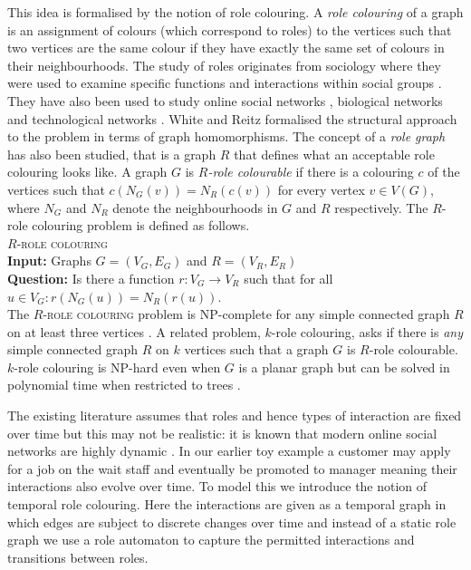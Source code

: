 \documentclass[runningheads]{llncs}
\begin{document}
This idea is formalised by the notion of role colouring.
A \textit{role colouring} of a graph is an assignment of colours (which correspond to roles) to the vertices such that two vertices are the same colour if they have exactly the same set of colours in their neighbourhoods. 
The study of roles originates  from sociology where they were used to examine specific functions and interactions within social groups \cite{borgatti2024analyzing,lorrain1971structural}. They have also been used to study online social networks \cite{golder2004social}, biological networks \cite{luczkovich2003defining} and technological networks \cite{scripps2007node}.
White and Reitz \cite{white1983graph} formalised the structural approach to the problem in terms of graph homomorphisms.
The concept of a \textit{role  graph} has also been studied, that is a graph $R$ that defines what an acceptable role colouring looks like. A graph $G$ is \textit{$R$-role colourable} if there is a colouring $c$ of the vertices such that $c(N_G(v))=N_R(c(v))$ for every vertex $v \in V(G)$, where $N_G$ and $N_R$ denote the neighbourhoods in $G$ and $R$ respectively. 
The $R$-role colouring problem is defined as follows.\\

\noindent
\textsc{$R$-role colouring}\\
\textbf{Input:} Graphs $G=(V_G,E_G)$ and $R=(V_R,E_R)$\\
\textbf{Question:} Is there a function $r:V_G \rightarrow V_R$ such that for all $u\in V_G: r(N_G(u))=N_R(r(u))$.\\

The \textsc{$R$-role colouring} problem is NP-complete for any simple connected graph $R$ on at least three vertices \cite{fiala2005complete}. A related problem, $k$-role colouring, asks if there is \emph{any} simple connected graph $R$ on $k$ vertices such that a graph $G$ is $R$-role colourable.   $k$-role colouring is NP-hard even when $G$ is a planar graph but can be solved in polynomial time when restricted to trees \cite{purcell2015complexity}.

The existing literature assumes that roles and hence types of interaction are fixed over time but this may not be realistic: it is known that modern online social networks are highly dynamic \cite{kumar2006structure}. In our earlier toy example a customer may apply for a job on the wait staff and eventually be promoted to manager meaning their interactions also evolve over time. To model this we introduce the notion of temporal role colouring. Here the interactions are given as a temporal graph in which edges are subject to discrete changes over time and instead of a static role graph we use a role automaton to capture the permitted interactions and transitions between roles.
\end{document}
